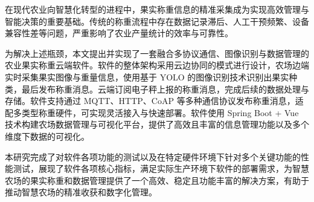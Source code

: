 在现代农业向智慧化转型的进程中，果实称重信息的精准采集成为实现高效管理与智能决策的重要基础。传统的称重流程中存在数据记录滞后、人工干预频繁、设备兼容性差等问题，严重影响了农业产量统计的效率与可靠性。

为解决上述瓶颈，本文提出并实现了一套融合多协议通信、图像识别与数据管理的农业果实称重云端软件。软件的整体架构采用云边协同的模式进行设计，农场边端实时采集果实图像与重量信息，使用基于 YOLO 的图像识别技术识别出果实种类，最后发布称重消息。云端订阅电子秤上报的称重消息，完成后续的数据处理与存储。软件支持通过 MQTT、HTTP、CoAP 等多种通信协议发布称重消息，适配多类型称重硬件，可实现灵活接入与快速部署。软件使用 Spring Boot + Vue 技术构建农场数据管理与可视化平台，提供了高效且丰富的信息管理功能以及多个维度下数据的可视化。

本研究完成了对软件各项功能的测试以及在特定硬件环境下针对多个关键功能的性能测试，展现了软件各项核心指标，满足实际生产环境下软件的部署需求，为智慧农场的果实称重和数据管理提供了一个高效、稳定且功能丰富的解决方案，有助于推动智慧农场的精准收获和数字化管理。 
